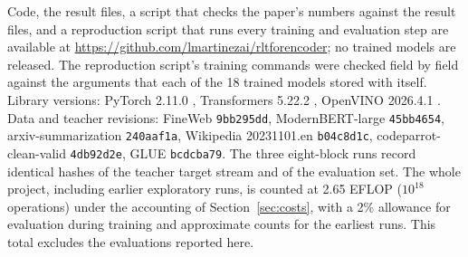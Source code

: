 \documentclass[11pt]{article}
\begin{document}
Code, the result files, a script that checks the paper's numbers against the result files, and a reproduction script that runs every
training and evaluation step are available at \url{https://github.com/lmartinezai/rltforencoder}; no trained models are released. The reproduction script's
training commands were checked field by field against the arguments that each of the 18 trained models stored with itself. Library versions: PyTorch 2.11.0 \citep{paszke2019pytorch}, Transformers 5.22.2 \citep{wolf2020transformers}, OpenVINO 2026.4.1
\citep{openvino}. Data and
teacher revisions: FineWeb \texttt{9bb295dd}, ModernBERT-large \texttt{45bb4654}, arxiv-summarization \texttt{240aaf1a}, Wikipedia 20231101.en
\texttt{b04c8d1c}, codeparrot-clean-valid \texttt{4db92d2e}, GLUE \texttt{bcdcba79}. The three eight-block runs record identical hashes of the
teacher target stream and of the evaluation set. The whole project, including earlier exploratory runs, is counted at 2.65 EFLOP ($10^{18}$ operations)
under the accounting of Section~\ref{sec:costs}, with a 2\% allowance for evaluation during training and approximate counts for the earliest runs.
This total excludes the evaluations reported here.



\end{document}
